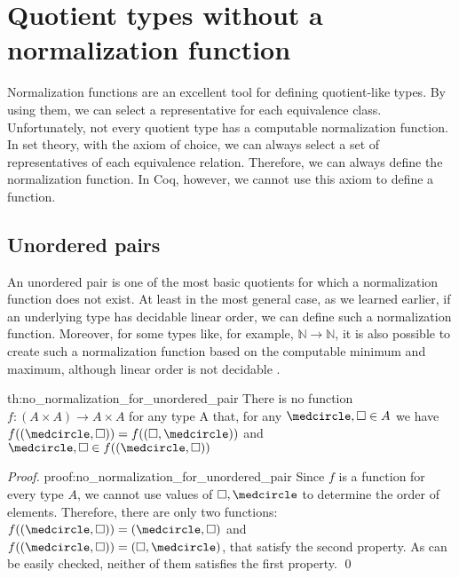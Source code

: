 \section{Quotient types without a normalization function}
Normalization functions are an excellent tool for defining quotient-like types. By using them, we can select a representative for each equivalence class. Unfortunately, not every quotient type has a computable normalization function. In set theory, with the axiom of choice, we can always select a set of representatives of each equivalence relation. Therefore, we can always define the normalization function. In Coq, however, we cannot use this axiom to define a function. 

\subsection{Unordered pairs}
An unordered pair is one of the most basic quotients for which a normalization function does not exist. At least in the most general case, as we learned earlier, if an underlying type has decidable linear order, we can define such a normalization function. Moreover, for some types like, for example, $\mathbb{N} \rightarrow \mathbb{N}$, it is also possible to create such a normalization function based on the computable minimum and maximum, although linear order is not decidable \cite{DefinableQuotients}.

\begin{theo}{}{th:no_normalization_for_unordered_pair}
There is no function $f: (A \times A) \rightarrow A \times A$ for any type A that, for any $\medcircle , \square \in A$ we have $f((\medcircle , \square)) = f((\square, \medcircle))$ and $\medcircle , \square \in f((\medcircle , \square))$ 
\end{theo}

\begin{proof}{}{proof:no_normalization_for_unordered_pair}
Since $f$ is a function for every type $A$, we cannot use values of $\square, \medcircle$ to determine the order of elements. Therefore, there are only two functions: $f((\medcircle , \square)) = (\medcircle , \square)$ and $f((\medcircle , \square)) = (\square , \medcircle)$, that satisfy the second property. As can be easily checked, neither of them satisfies the first property. \qed
\end{proof}

